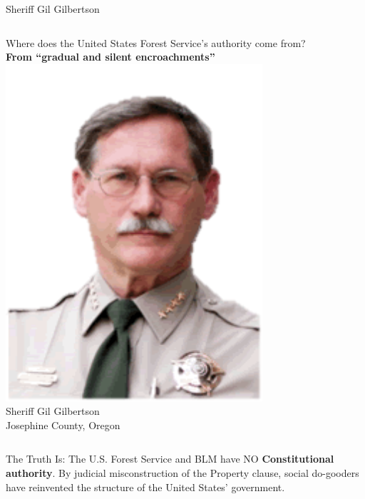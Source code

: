 \begin{frame}{Sheriff Gil Gilbertson}
    \begin{columns}[onlytextwidth]
            \centering
            Where does the United States Forest Service's authority come from? \\
            \vspace{20pt}
            \textbf{ \Large \color{red}
                From ``gradual and silent encroachments''
            }
            \centering
            \includegraphics[width=0.75\textwidth]{img/gil-gilbertson.png}
            \\ Sheriff Gil Gilbertson
            \\ Josephine County, Oregon
    \end{columns}
\end{frame}

\begin{frame}{The Truth Is:}
    \large
    The U.S. Forest Service and BLM have NO \textbf{Constitutional authority}.
    By judicial misconstruction of the Property clause, social do-gooders have
    reinvented the structure of the United States' government.
\end{frame}

